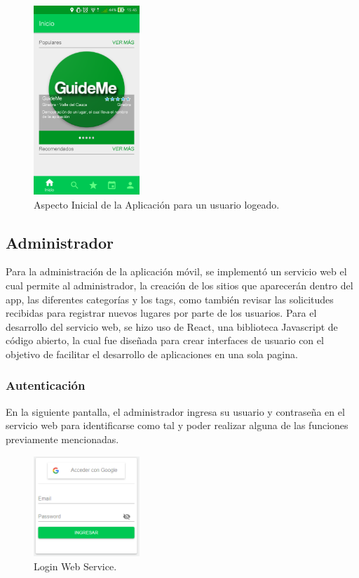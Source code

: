 \documentclass[12pt,letterpaper,openany]{book}
\begin{document}
\begin{figure}[H]
\begin{center}
\includegraphics[width=4cm]{./imagenes/gui}
\caption{Aspecto Inicial de la Aplicación para un usuario logeado.}
\end{center}
\end{figure}

\subsection{Administrador}
Para la administración de la aplicación móvil, se implementó un servicio web el cual permite al administrador, la creación de los sitios que aparecerán dentro del app, las diferentes categorías y los tags, como también revisar las solicitudes recibidas para registrar nuevos lugares por parte de los usuarios.
\vspace{5mm}\newline
Para el desarrollo del servicio web, se hizo uso de React, una biblioteca Javascript de código abierto, la cual fue diseñada para crear interfaces de usuario con el objetivo de facilitar el desarrollo de aplicaciones en una sola pagina.

\subsubsection{Autenticación}
En la siguiente pantalla, el administrador ingresa su usuario y contraseña en el servicio web para identificarse como tal y poder realizar alguna de las funciones previamente mencionadas.

\begin{figure}[H]
\begin{center}
\includegraphics[width=4cm]{./imagenes/admin/login}
\caption{Login Web Service.}
\end{center}
\end{figure}
\end{document}
